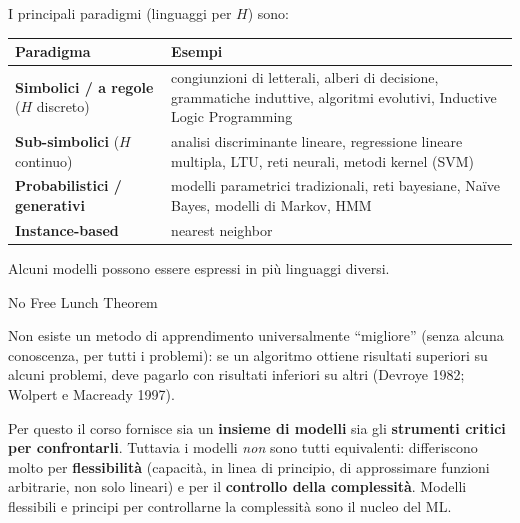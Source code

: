 I principali paradigmi (linguaggi per \(H\)) sono:

{\def\LTcaptype{none} %
\begin{longtable}[]{@{}
  >{\raggedright\arraybackslash}p{}
  >{\raggedright\arraybackslash}p{}@{}}
\toprule\noalign{}
\begin{minipage}[b]{\linewidth}\raggedright
Paradigma
\end{minipage} & \begin{minipage}[b]{\linewidth}\raggedright
Esempi
\end{minipage} \\
\midrule\noalign{}
\endhead
\bottomrule\noalign{}
\endlastfoot
\textbf{Simbolici / a regole} (\(H\) discreto) & congiunzioni di
letterali, alberi di decisione, grammatiche induttive, algoritmi
evolutivi, Inductive Logic Programming \\
\textbf{Sub-simbolici} (\(H\) continuo) & analisi discriminante lineare,
regressione lineare multipla, LTU, reti neurali, metodi kernel (SVM) \\
\textbf{Probabilistici / generativi} & modelli parametrici tradizionali,
reti bayesiane, Naïve Bayes, modelli di Markov, HMM \\
\textbf{Instance-based} & nearest neighbor \\
\end{longtable}
}

Alcuni modelli possono essere espressi in più linguaggi diversi.

\begin{boxtheorem}{No Free Lunch Theorem}

Non esiste un metodo di apprendimento universalmente ``migliore'' (senza
alcuna conoscenza, per tutti i problemi): se un algoritmo ottiene
risultati superiori su alcuni problemi, deve pagarlo con risultati
inferiori su altri (Devroye 1982; Wolpert e Macready 1997).

\end{boxtheorem}

Per questo il corso fornisce sia un \textbf{insieme di modelli} sia gli
\textbf{strumenti critici per confrontarli}. Tuttavia i modelli
\emph{non} sono tutti equivalenti: differiscono molto per
\textbf{flessibilità} (capacità, in linea di principio, di approssimare
funzioni arbitrarie, non solo lineari) e per il \textbf{controllo della
complessità}. Modelli flessibili e principi per controllarne la
complessità sono il nucleo del ML.

